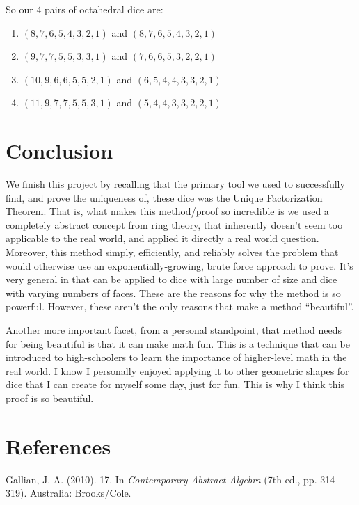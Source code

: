 \documentclass[12pt]{report}
\begin{document}
So our 4 pairs of octahedral dice are:
\begin{enumerate}
\item $(8,7,6,5,4,3,2,1)$ and $(8,7,6,5,4,3,2,1)$
\item $(9,7,7,5,5,3,3,1)$ and $(7,6,6,5,3,2,2,1)$
\item $(10,9,6,6,5,5,2,1)$ and $(6,5,4,4,3,3,2,1)$
\item $(11,9,7,7,5,5,3,1)$ and $(5,4,4,3,3,2,2,1)$
\end{enumerate}

\section*{Conclusion}
We finish this project by recalling that the primary tool we used to successfully find, and prove the
uniqueness of, these dice was the Unique Factorization Theorem. That is, what makes this method/proof so
incredible is we used a completely abstract concept from ring theory, that inherently doesn't seem too
applicable to the real world, and applied it directly a real world question. Moreover, this method simply,
efficiently, and reliably solves the problem that would otherwise use an exponentially-growing, brute force
approach to prove. It's very general in that can be applied to dice with large number of size and dice with
varying numbers of faces. These are the reasons for why the method is so powerful. However, these aren't the
only reasons that make a method ``beautiful''.

Another more important facet, from a personal standpoint, that method needs for being beautiful is that it can
make math fun. This is a technique that can be introduced to high-schoolers to learn the importance of
higher-level math in the real world. I know I personally enjoyed applying it to other geometric shapes for
dice that I can create for myself some day, just for fun. This is why I think this proof is so beautiful.

\section*{References}
Gallian, J. A. (2010). 17. In \textit{Contemporary Abstract Algebra} (7th ed., pp. 314-319). Australia: Brooks/Cole.
\end{document}
